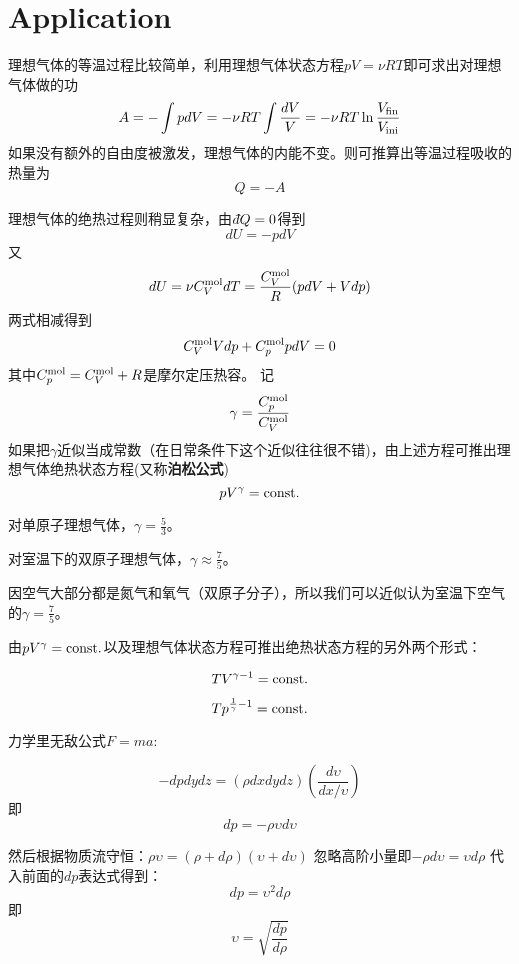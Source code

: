 \documentclass[CJK]{beamer}
\begin{document}
\section{Application}

\begin{frame}
\bch
理想气体的等温过程比较简单，利用理想气体状态方程$pV = \nu RT$即可求出对理想气体做的功
$$ A = -\int p dV = -\nu R T \int \frac{dV}{V} =- \nu R T\ln\frac{V_{\rm fin}}{V_{\rm ini}}$$
如果没有额外的自由度被激发，理想气体的内能不变。则可推算出等温过程吸收的热量为
$$ Q = - A $$
\ech
\end{frame}


\begin{frame}
\bch
{\small
理想气体的绝热过程则稍显复杂，由$\dbar Q=0$得到
$$ dU = -p dV$$
又$$ dU = \nu C_V^{\rm mol} dT = \frac{C_V^{\rm mol}}{R}(p dV + V dp)$$
两式相减得到
$$ C_V^{\rm mol} Vdp + C_p^{\rm mol} p dV = 0$$
其中$C_p^{\rm mol} = C_V^{\rm mol} + R$是摩尔定压热容。
记$$\gamma = \frac{C_p^{\rm mol}}{C_V^{\rm mol}}$$
如果把$\gamma$近似当成常数（在日常条件下这个近似往往很不错)，由上述方程可推出{\blue 理想气体绝热状态方程}(又称{\bf 泊松公式})
{\blue 
$$p V^\gamma = \mathrm{const.}$$}
}
\ech
\end{frame}


\begin{frame}
\bch
{\small
对单原子理想气体，$\gamma = \frac{5}{3}$。

\skipline

对室温下的双原子理想气体，$\gamma \approx \frac{7}{5}$。

\skipline

因空气大部分都是氮气和氧气（双原子分子），所以我们可以近似认为室温下空气的$\gamma = \frac{7}{5}$。
}

由$pV^\gamma = \mathrm{const.} $以及理想气体状态方程可推出绝热状态方程的另外两个形式：

$$ TV^{\gamma-1} = \mathrm{const.}$$

$$T p^{\frac{1}{\gamma}-1} = \mathrm{const.} $$
\ech
\end{frame}

\begin{frame}
\bch
{}

{\scriptsize
力学里无敌公式$F = ma$:

$$ -dp dy dz = (\rho dx dy dz) \left(\frac{d\upsilon}{dx/\upsilon}\right) $$
即
$$ dp = - \rho \upsilon d\upsilon $$

然后根据物质流守恒：$ \rho \upsilon = (\rho + d\rho)(\upsilon+d\upsilon)$
忽略高阶小量即$ -\rho d\upsilon = \upsilon d\rho$
代入前面的$dp$表达式得到：
$$ dp = \upsilon ^2 d\rho$$
即
$$\upsilon = \sqrt{\frac{dp}{d\rho}}$$
}
\ech
\end{frame}
\end{document}
